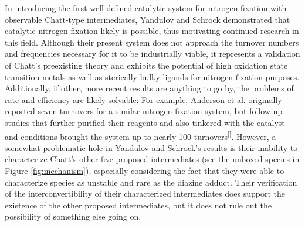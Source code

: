 \documentclass[titlepage,12pt]{article}
\begin{document}
In introducing the first well-defined catalytic system for nitrogen fixation with observable Chatt-type intermediates, Yandulov and Schrock demonstrated that catalytic nitrogen fixation likely is possible, thus motivating continued research in this field. Although their present system does not approach the turnover numbers and frequencies necessary for it to be industrially viable, it represents a validation of Chatt's preexisting theory and exhibits the potential of high oxidation state transition metals as well as sterically bulky ligands for nitrogen fixation purposes. Additionally, if other, more recent results are anything to go by, the problems of rate and efficiency are likely solvable: For example, Anderson et al. originally reported seven turnovers for a similar nitrogen fixation system, but follow up studies that further purified their reagents and also tinkered with the catalyst and conditions brought the system up to nearly 100 turnovers\textsuperscript{[}\autocite{bib:AndersonPeters}\textsuperscript{]}. However, a somewhat problematic hole in Yandulov and Schrock's results is their inability to characterize Chatt's other five proposed intermediates (see the unboxed species in Figure \ref{fig:mechanism}), especially considering the fact that they were able to characterize species as unstable and rare as the diazine adduct. Their verification of the interconvertibility of their characterized intermediates does support the existence of the other proposed intermediates, but it does not rule out the possibility of something else going on.


\newpage



\printbibliography
\end{document}
